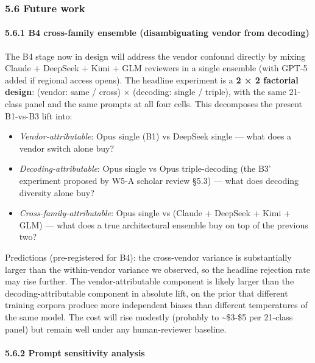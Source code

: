 \documentclass[
  letterpaper,
  11pt]{article}
\providecommand{\tightlist}{%
  \setlength{\itemsep}{0pt}\setlength{\parskip}{0pt}}
\begin{document}
\subsubsection{5.6 Future work}\label{future-work}

\paragraph{5.6.1 B4 cross-family ensemble (disambiguating vendor from
decoding)}\label{b4-cross-family-ensemble-disambiguating-vendor-from-decoding}

The B4 stage now in design will address the vendor confound directly by
mixing Claude + DeepSeek + Kimi + GLM reviewers in a single ensemble
(with GPT-5 added if regional access opens). The headline experiment is
a \textbf{2 × 2 factorial design}: (vendor: same / cross) × (decoding:
single / triple), with the same 21-class panel and the same prompts at
all four cells. This decomposes the present B1-vs-B3 lift into:

\begin{itemize}
\tightlist
\item
  \emph{Vendor-attributable}: Opus single (B1) vs DeepSeek single ---
  what does a vendor switch alone buy?
\item
  \emph{Decoding-attributable}: Opus single vs Opus triple-decoding (the
  B3' experiment proposed by W5-A scholar review §5.3) --- what does
  decoding diversity alone buy?
\item
  \emph{Cross-family-attributable}: Opus single vs (Claude + DeepSeek +
  Kimi + GLM) --- what does a true architectural ensemble buy on top of
  the previous two?
\end{itemize}

Predictions (pre-registered for B4): the cross-vendor variance is
substantially larger than the within-vendor variance we observed, so the
headline rejection rate may rise further. The vendor-attributable
component is likely larger than the decoding-attributable component in
absolute lift, on the prior that different training corpora produce more
independent biases than different temperatures of the same model. The
cost will rise modestly (probably to \textasciitilde\$3-\$5 per 21-class
panel) but remain well under any human-reviewer baseline.

\paragraph{5.6.2 Prompt sensitivity
analysis}\label{prompt-sensitivity-analysis}
\end{document}

